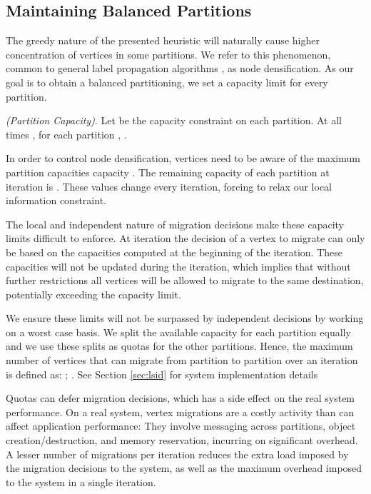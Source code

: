 \documentclass{sig-alternate-10pt}
\newenvironment{definition}[1][Definition]{\begin{trivlist}
\item[\hskip \labelsep {\bfseries #1}]}{\end{trivlist}}
\begin{document}
\subsection{Maintaining Balanced Partitions}

The greedy nature of the presented heuristic will naturally cause higher concentration of vertices in some partitions. We refer to this phenomenon, common to general label propagation algorithms \cite{raghavan2007}, as node densification. As our goal is to obtain a balanced partitioning, we set a capacity limit  for every partition.
\begin{definition} \emph{(Partition Capacity)}.
Let  be the capacity constraint on each partition. At all times , for each partition , . 
\end{definition}

In order to control node densification, vertices need to be aware of the maximum partition capacities capacity . The remaining capacity of each partition  at iteration  is . These values change every iteration, forcing to relax our local information constraint.
 
The local and independent nature of migration decisions make these capacity limits difficult to enforce. At iteration  the decision of a vertex to migrate can only be based on the capacities  computed at the beginning of the iteration. These capacities will not be updated during the iteration, which implies that without further restrictions all vertices will be allowed to migrate to the same destination, potentially exceeding the capacity limit. 

We ensure these limits will not be surpassed by independent  decisions by working on a worst case basis. We split the available capacity for each partition equally and we use these splits as quotas for the other partitions. Hence, the maximum number of vertices that can migrate from partition  to partition  over an iteration  is defined as: ; . See Section \ref{sec:lsid} for system implementation details  

Quotas can defer migration decisions, which has a side effect on the real system performance. On a real system, vertex migrations are a costly activity than can affect application performance: They involve messaging across partitions, object creation/destruction, and memory reservation, incurring on significant overhead. A lesser number of migrations per iteration reduces the extra load imposed by the migration decisions to the system, as well as the maximum overhead imposed to the system in a single iteration.
\end{document}
